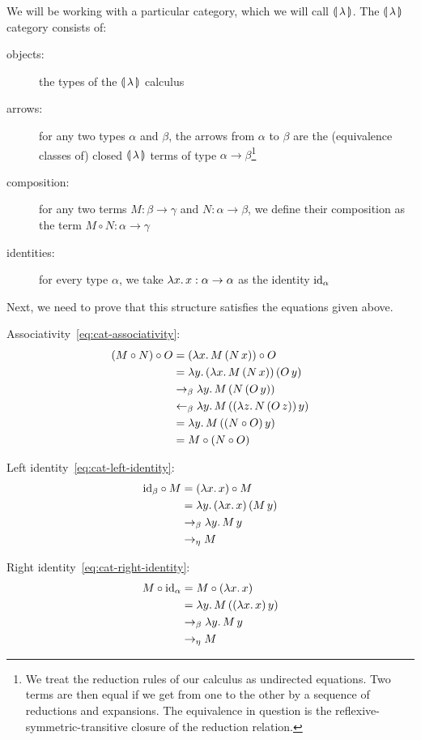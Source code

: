 We will be working with a particular category, which we will call
$\llparenthesis \, \lambda \, \rrparenthesis$. The $\llparenthesis \, \lambda \, \rrparenthesis$ category consists of:
\begin{description}
\item[objects:] the types of the $\llparenthesis \, \lambda \, \rrparenthesis$ calculus
\item[arrows:] for any two types $\alpha$ and $\beta$, the arrows from
  $\alpha$ to $\beta$ are the (equivalence classes of) closed
  $\llparenthesis \, \lambda \, \rrparenthesis$ terms of type $\alpha \to \beta$\footnote{We treat the
    reduction rules of our calculus as undirected equations. Two terms are
    then equal if we get from one to the other by a sequence of reductions
    and expansions. The equivalence in question is the
    reflexive-symmetric-transitive closure of the reduction relation.}
\item[composition:] for any two terms $M : \beta \to \gamma$ and $N :
  \alpha \to \beta$, we define their composition as the term $M \circ N :
  \alpha \to \gamma$
\item[identities:] for every type $\alpha$, we take $\lambda x.\, x : \alpha
  \to \alpha$ as the identity $\mathrm{id}_\alpha$
\end{description}

Next, we need to prove that this structure satisfies the equations given
above.

Associativity~\eqref{eq:cat-associativity}:
\begin{align*}
  (M \circ N) \circ O
  &= (\lambda x.\, M\,(N\,x)) \circ O \\
  &= \lambda y.\, (\lambda x.\, M\,(N\,x))\,(O\,y) \\
  &\to_\beta \lambda y.\, M\,(N\,(O\,y)) \\
  &\leftarrow_\beta \lambda y.\, M\,((\lambda z.\, N\,(O\,z))\,y) \\
  &= \lambda y.\, M\,((N \circ O)\,y) \\
  &= M \circ (N \circ O)
\end{align*}

Left identity~\eqref{eq:cat-left-identity}:
\begin{align*}
  \mathrm{id}_\beta \circ M
  &= (\lambda x.\, x) \circ M \\
  &= \lambda y.\, (\lambda x.\, x)\,(M\,y) \\
  &\to_\beta \lambda y.\, M\,y \\
  &\to_\eta M
\end{align*}

Right identity~\eqref{eq:cat-right-identity}:
\begin{align*}
  M \circ \mathrm{id}_\alpha
  &= M \circ (\lambda x.\, x) \\
  &= \lambda y.\, M\,((\lambda x.\, x)\,y) \\
  &\to_\beta \lambda y.\, M\,y \\
  &\to_\eta M
\end{align*}


